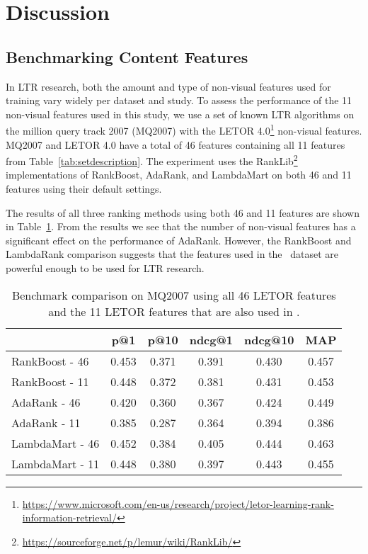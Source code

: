 
\section{Discussion}
\subsection{Benchmarking Content Features}

In \ac{LTR} research, both the amount and type of non-visual features used for training vary widely per dataset and study.
To assess the performance of the 11 non-visual features used in this study, we use a set of known LTR algorithms on the million query track 2007 (MQ2007)\cite{allan2007million} with the LETOR 4.0\footnote{\url{https://www.microsoft.com/en-us/research/project/letor-learning-rank-information-retrieval/}} non-visual features.
MQ2007 and LETOR 4.0 have a total of 46 features containing all 11 features from Table~\ref{tab:setdescription}.
The experiment uses the RankLib\footnote{\url{https://sourceforge.net/p/lemur/wiki/RankLib/}} implementations of RankBoost, AdaRank, and LambdaMart on both 46 and 11 features using their default settings. 

The results of all three ranking methods using both 46 and 11 features are shown in Table~\ref{tab:11vs46}.
From the results we see that the number of non-visual features has a significant effect on the performance of AdaRank. However, the RankBoost and LambdaRank comparison suggests that the features used in the \datasetname~dataset are powerful enough to be used for \ac{LTR} research.

\begin{table}[h]
\caption{Benchmark comparison on MQ2007 using all 46 LETOR features and the 11 LETOR features that are also used in \datasetname.}
\label{tab:11vs46}
\centering
\begin{tabular}{lccccc}
\toprule
           & p@1  & p@10   & ndcg@1 & ndcg@10 & MAP \\ 
\midrule
RankBoost - 46 & 0.453 & 0.371 & 0.391 & 0.430  & 0.457 \\
RankBoost - 11 & 0.448 & 0.372 & 0.381  & 0.431   & 0.453 \\
\midrule
AdaRank - 46  & 0.420 & 0.360 & 0.367 & 0.424  & 0.449 \\
AdaRank - 11  & 0.385 & 0.287 & 0.364  & 0.394   & 0.386 \\ 
\midrule
LambdaMart - 46 & 0.452 & 0.384 & 0.405 & 0.444  & 0.463 \\
LambdaMart - 11 & 0.448 & 0.380 & 0.397  & 0.443   & 0.455 \\
\bottomrule
\end{tabular}
\end{table}

